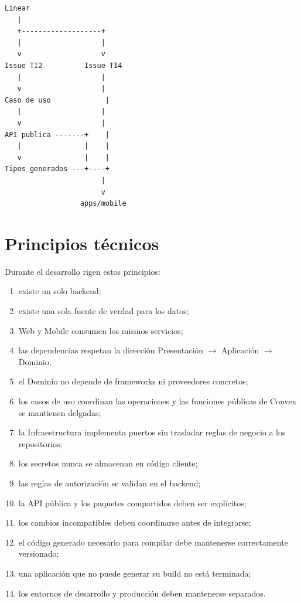 \documentclass[11pt,a4paper]{article}
\begin{document}
\begin{lstlisting}
Linear
   |
   +-------------------+
   |                   |
   v                   v
Issue TI2          Issue TI4
   |                   |
   v                   |
Caso de uso             |
   |                   |
   v                   |
API publica -------+    |
   |               |    |
   v               |    |
Tipos generados ---+----+
                       |
                       v
                  apps/mobile
\end{lstlisting}

\section{Principios técnicos}

Durante el desarrollo rigen estos principios:

\begin{enumerate}
  \item existe un solo backend;
  \item existe una sola fuente de verdad para los datos;
  \item Web y Mobile consumen los mismos servicios;
  \item las dependencias respetan la dirección Presentación $\rightarrow$
    Aplicación $\rightarrow$ Dominio;
  \item el Dominio no depende de frameworks ni proveedores concretos;
  \item los casos de uso coordinan las operaciones y las funciones públicas
    de Convex se mantienen delgadas;
  \item la Infraestructura implementa puertos sin trasladar reglas de negocio
    a los repositorios;
  \item los secretos nunca se almacenan en código cliente;
  \item las reglas de autorización se validan en el backend;
  \item la API pública y los paquetes compartidos deben ser explícitos;
  \item los cambios incompatibles deben coordinarse antes de integrarse;
  \item el código generado necesario para compilar debe mantenerse
    correctamente versionado;
  \item una aplicación que no puede generar su build no está terminada;
  \item los entornos de desarrollo y producción deben mantenerse separados.
\end{enumerate}
\end{document}
